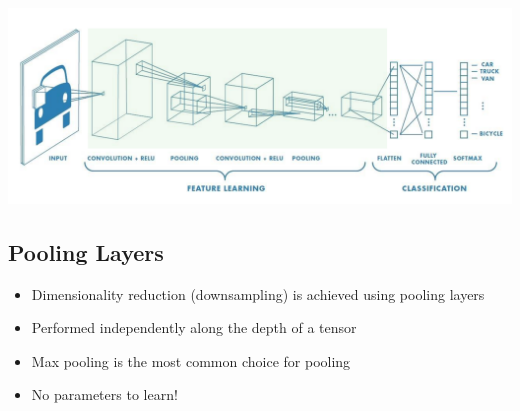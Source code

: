 \documentclass[11pt]{article}
\begin{document}
\begin{center}
\includegraphics[scale=0.6]{images/cnn.png}
\end{center}

\subsection{Pooling Layers}
\begin{itemize}
\item Dimensionality reduction (downsampling) is achieved using pooling layers
\item Performed independently along the depth of a tensor
\item Max pooling is the most common choice for pooling
\item No parameters to learn!
\end{itemize}
\end{document}
